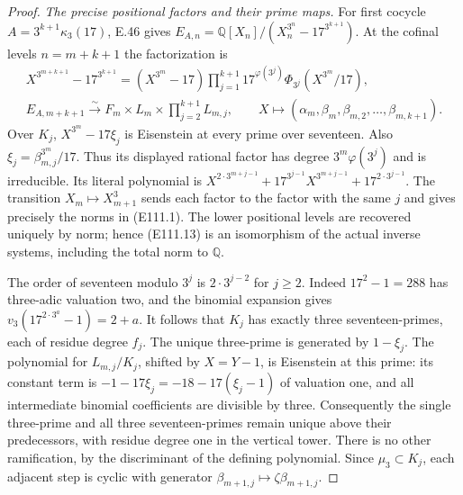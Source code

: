 \begin{proof}
\emph{The precise positional factors and their prime maps.}
For first cocycle $A=3^{k+1}\kappa_3(17)$, E.46 gives
$E_{A,n}=\mathbb Q[X_n]/(X_n^{3^n}-17^{3^{k+1}})$.
At the cofinal levels $n=m+k+1$ the factorization is
\[
 \begin{gathered}
 X^{3^{m+k+1}}-17^{3^{k+1}}
 =(X^{3^m}-17)\prod_{j=1}^{k+1}
      17^{\varphi(3^j)}\Phi_{3^j}(X^{3^m}/17),\\
 E_{A,m+k+1}\xrightarrow{\sim}
 F_m\times L_m\times\prod_{j=2}^{k+1}L_{m,j},
 \qquad X\longmapsto
       (\alpha_m,\beta_m,\beta_{m,2},\ldots,\beta_{m,k+1}).
 \end{gathered}
 \tag{E111.13}
\]
Over $K_j$, $X^{3^m}-17\xi_j$ is Eisenstein at every
prime over seventeen. Also $\xi_j=\beta_{m,j}^{3^m}/17$.
Thus its displayed rational factor has degree
$3^m\varphi(3^j)$ and is irreducible. Its literal polynomial is
$X^{2\cdot3^{m+j-1}}+17^{3^{j-1}}X^{3^{m+j-1}}
+17^{2\cdot3^{j-1}}$.
The transition $X_m\mapsto X_{m+1}^3$ sends each factor
to the factor with the same $j$ and gives precisely the
norms in (E111.1). The lower positional levels are recovered
uniquely by norm; hence (E111.13) is an isomorphism of the
actual inverse systems, including the total norm to $\mathbb Q$.

The order of seventeen modulo $3^j$ is
$2\cdot3^{j-2}$ for $j\ge2$. Indeed
$17^2-1=288$ has three-adic valuation two, and the
binomial expansion gives
$v_3(17^{2\cdot3^a}-1)=2+a$.
It follows that $K_j$ has exactly three seventeen-primes,
each of residue degree $f_j$. The unique three-prime is
generated by $1-\xi_j$.
The polynomial for $L_{m,j}/K_j$, shifted by $X=Y-1$,
is Eisenstein at this prime: its constant term is
$-1-17\xi_j=-18-17(\xi_j-1)$ of valuation one, and all
intermediate binomial coefficients are divisible by three.
Consequently the single three-prime and all three
seventeen-primes remain unique above their predecessors,
with residue degree one in the vertical tower. There is
no other ramification, by the discriminant of the defining
polynomial. Since $\mu_3\subset K_j$, each adjacent step
is cyclic with generator $\beta_{m+1,j}\mapsto
\zeta\beta_{m+1,j}$.


\end{proof}

